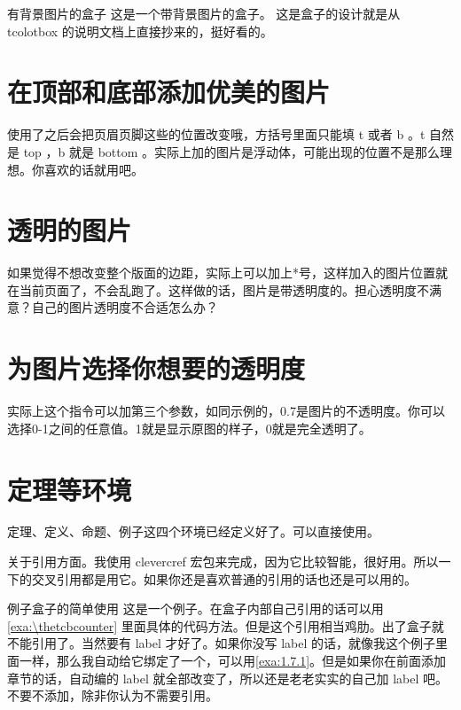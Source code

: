 \documentclass[bibstyle=super,font=empty]{Muse-Book}
\begin{document}
\begin{muse-pbox}{有背景图片的盒子}
	这是一个带背景图片的盒子。
	\tcblower
	这是盒子的设计就是从 tcolotbox 的说明文档上直接抄来的，挺好看的。
\end{muse-pbox}
\newpage
\section{在顶部和底部添加优美的图片}
使用了之后会把页眉页脚这些的位置改变哦，方括号里面只能填 t 或者 b 。t 自然是 top ，b 就是 bottom 。实际上加的图片是浮动体，可能出现的位置不是那么理想。你喜欢的话就用吧。
\newpage
\section{透明的图片}
如果觉得不想改变整个版面的边距，实际上可以加上*号，这样加入的图片位置就在当前页面了，不会乱跑了。这样做的话，图片是带透明度的。担心透明度不满意？自己的图片透明度不合适怎么办？
\newpage
\section{为图片选择你想要的透明度}
实际上这个指令可以加第三个参数，如同示例的，0.7是图片的不透明度。你可以选择0-1之间的任意值。1就是显示原图的样子，0就是完全透明了。

\section{定理等环境}

定理、定义、命题、例子这四个环境已经定义好了。可以直接使用。

关于引用方面。我使用 clevercref 宏包来完成，因为它比较智能，很好用。所以一下的交叉引用都是用它。如果你还是喜欢普通的引用的话也还是可以用的。

\begin{muse-example}{例子盒子的简单使用}
	这是一个例子。在盒子内部自己引用的话可以用 \cref{exa:\thetcbcounter} 里面具体的代码方法。但是这个引用相当鸡肋。出了盒子就不能引用了。当然要有 label 才好了。如果你没写 label 的话，就像我这个例子里面一样，那么我自动给它绑定了一个，可以用\cref{exa:1.7.1}。但是如果你在前面添加章节的话，自动编的 label 就全部改变了，所以还是老老实实的自己加 label 吧。不要不添加，除非你认为不需要引用。
\end{muse-example}
\end{document}
